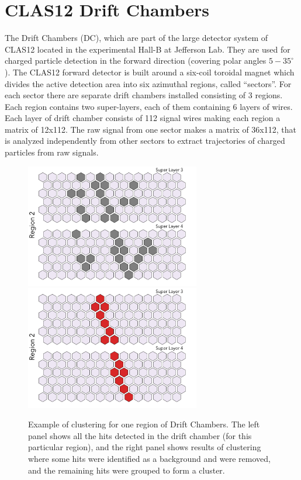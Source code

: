 \section{CLAS12 Drift Chambers}

The Drift Chambers (DC), which are  part of the large detector system of CLAS12 located in the experimental 
Hall-B at Jefferson Lab. They are used for charged particle detection in the forward direction 
(covering polar angles $5-35^\circ$). The CLAS12 forward detector is built around a six-coil 
toroidal magnet which divides the active detection area into six azimuthal regions, called “sectors”. 
For each sector there are separate drift chambers installed consisting of 3 regions. Each region contains 
two super-layers, each of them containing 6 layers of wires.   Each layer of drift chamber 
consists of 112 signal wires making each region a matrix of 12x112. The raw signal from 
one sector makes a matrix of 36x112, that is analyzed independently from other sectors
to extract trajectories of charged particles from raw signals. 

 \begin{figure}[!h]
\begin{center}
 \includegraphics[width=3in]{images/dc_region_2_with_noise.pdf}
 \includegraphics[width=3in]{images/dc_region_2_no_noise.pdf}
\caption {Example of clustering for one region of Drift Chambers. The left panel shows 
all the hits detected in the drift chamber (for this particular region), and the right panel 
shows results of clustering where some hits were identified as a background and were removed,
and the remaining hits were grouped to form a cluster.}
 \label{conv:denoising}
 \end{center}
\end{figure}

